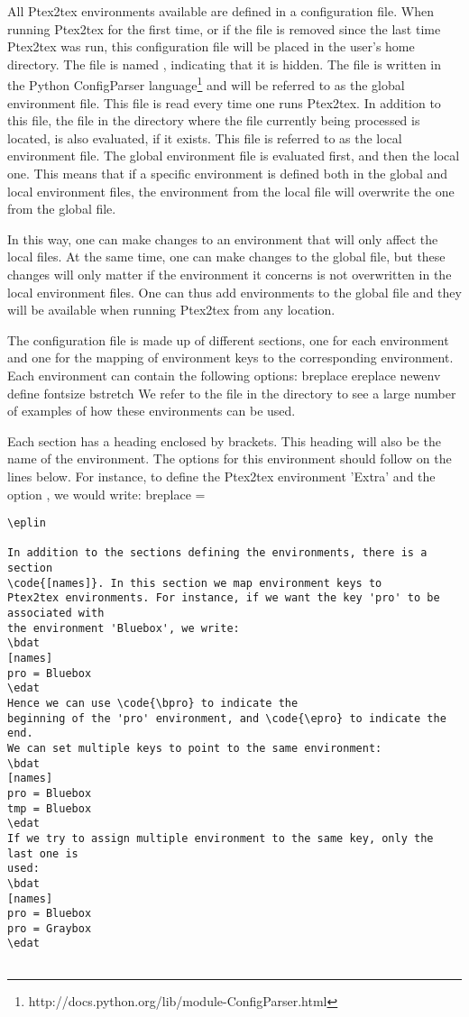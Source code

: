 \documentclass[a4paper,11pt]{article}
\begin{document}
{All Ptex2tex environments available are defined in a configuration
file. When running Ptex2tex for the first
time, or if the file is removed since the last time Ptex2tex was run,
this configuration file will be placed in the user's home directory. The file
is named , indicating that it is hidden. The file is
written in the Python ConfigParser
language\footnote{http://docs.python.org/lib/module-ConfigParser.html} and
will be referred to as the global environment file.
This file is read every time one runs Ptex2tex. In addition to
this file, the  file in the directory where the 
file currently being processed is located, is also evaluated, if it exists. This file is
referred to as the local environment file. The global environment
file is evaluated first, and then the local one. This means that if a
specific environment is defined both in the global and local environment
files, the environment from the local file will overwrite the one from the
global file.

In this way, one can make changes to an environment that will only affect the
local  files. At the same time, one can make changes to the
global file, but these changes will only matter if the environment it concerns
is not overwritten in the local environment files. One can thus add
environments to the global file and they will be available when running Ptex2tex
from any location.

The configuration file is made up of different sections, one for each
environment and one for the mapping of environment keys to the
corresponding environment. Each environment can contain the following options:
\bdat
breplace
ereplace
newenv
define
fontsize
bstretch
\edat
We refer to the  file in the 
directory to see a large number of examples of how these environments
can be used.

Each section has a heading enclosed by brackets. This heading will also be the
name of the environment. The options for this environment should follow on the
lines below. For instance, to define the Ptex2tex environment 'Extra'
and the option , we would write:
\bplin
[Extra]
breplace = \begin{Verbatim}
\eplin

In addition to the sections defining the environments, there is a section
\code{[names]}. In this section we map environment keys to
Ptex2tex environments. For instance, if we want the key 'pro' to be associated with
the environment 'Bluebox', we write:
\bdat
[names]
pro = Bluebox
\edat
Hence we can use \code{\bpro} to indicate the
beginning of the 'pro' environment, and \code{\epro} to indicate the end.
We can set multiple keys to point to the same environment:
\bdat
[names]
pro = Bluebox
tmp = Bluebox
\edat
If we try to assign multiple environment to the same key, only the last one is
used:
\bdat
[names]
pro = Bluebox
pro = Graybox
\edat


\end{Verbatim}}
\end{document}
